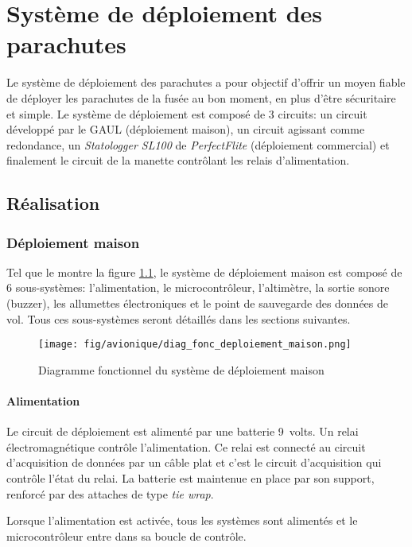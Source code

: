 \chapter{Système de déploiement des parachutes}
\label{chap:deploiement}

Le système de déploiement des parachutes a pour objectif d'offrir un moyen
fiable de déployer les parachutes de la fusée au bon moment, en plus d'être
sécuritaire et simple. Le système de déploiement est composé de 3 circuits: un
circuit développé par le GAUL (déploiement maison), un circuit agissant comme
redondance, un \textit{Statologger SL100} de \textit{PerfectFlite} (déploiement
commercial) et finalement le circuit de la manette contrôlant les relais
d'alimentation.

\section{Réalisation}

\subsection{Déploiement maison}


Tel que le montre la figure \ref{f:diag_fonc_deploiement_maison}, le système de
déploiement maison est composé de 6 sous-systèmes: l'alimentation, le
microcontrôleur, l'altimètre, la sortie sonore (buzzer), les allumettes
électroniques et le point de sauvegarde des données de vol. Tous ces
sous-systèmes seront détaillés dans les sections suivantes.

\begin{figure}[H]
	\center
	\texttt{[image: fig/avionique/diag\_fonc\_deploiement\_maison.png]}
	\caption{Diagramme fonctionnel du système de déploiement maison}
	\label{f:diag_fonc_deploiement_maison}
\end{figure}

\subsubsection{Alimentation}

Le circuit de déploiement est alimenté par une batterie 9~volts. Un relai
électromagnétique contrôle l'alimentation. Ce relai est connecté au circuit
d'acquisition de données par un câble plat et c'est le circuit d'acquisition
qui contrôle l'état du relai. La batterie est maintenue en place par son
support, renforcé par des attaches de type \textit{tie wrap}.
\\
\par
Lorsque l'alimentation est activée, tous les systèmes sont alimentés et le
microcontrôleur entre dans sa boucle de contrôle.

